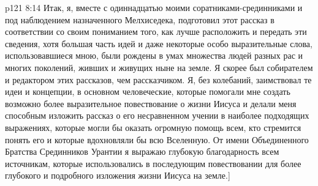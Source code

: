 \vs p121 8:14 Итак, я, вместе с одиннадцатью моими соратниками\hyp{}срединниками и под наблюдением назначенного Мелхиседека, подготовил этот рассказ в соответствии со своим пониманием того, как лучше расположить и передать эти сведения, хотя большая часть идей и даже некоторые особо выразительные слова, использовавшиеся мною, были рождены в умах множества людей разных рас и многих поколений, живших и живущих ныне на земле. Я скорее был собирателем и редактором этих рассказов, чем рассказчиком. Я, без колебаний, заимствовал те идеи и концепции, в основном человеческие, которые помогали мне создать возможно более выразительное повествование о жизни Иисуса и делали меня способным изложить рассказ о его несравненном учении в наиболее подходящих выражениях, которые могли бы оказать огромную помощь всем, кто стремится понять его и которые вдохновляли бы всю Вселенную. От имени Объединенного Братства Срединников Урантии я выражаю глубокую благодарность всем источникам, которые использовались в последующим повествовании для более глубокого и подробного изложения жизни Иисуса на земле.]

